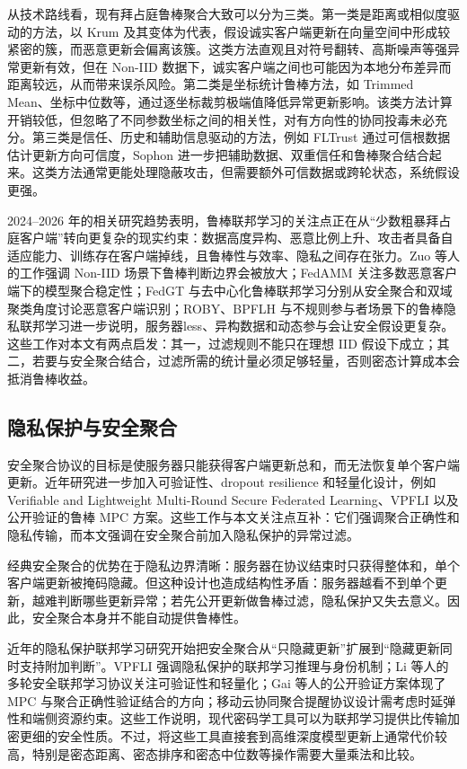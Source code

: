 \documentclass[final]{jcr}
\begin{document}
从技术路线看，现有拜占庭鲁棒聚合大致可以分为三类。第一类是距离或相似度驱动的方法，以 Krum 及其变体为代表，假设诚实客户端更新在向量空间中形成较紧密的簇，而恶意更新会偏离该簇。这类方法直观且对符号翻转、高斯噪声等强异常更新有效，但在 Non-IID 数据下，诚实客户端之间也可能因为本地分布差异而距离较远，从而带来误杀风险。第二类是坐标统计鲁棒方法，如 Trimmed Mean、坐标中位数等，通过逐坐标裁剪极端值降低异常更新影响。该类方法计算开销较低，但忽略了不同参数坐标之间的相关性，对有方向性的协同投毒未必充分。第三类是信任、历史和辅助信息驱动的方法，例如 FLTrust 通过可信根数据估计更新方向可信度\cite{fltrust2021}，Sophon 进一步把辅助数据、双重信任和鲁棒聚合结合起来\cite{sophon2025}。这类方法通常更能处理隐蔽攻击，但需要额外可信数据或跨轮状态，系统假设更强。

2024--2026 年的相关研究趋势表明，鲁棒联邦学习的关注点正在从“少数粗暴拜占庭客户端”转向更复杂的现实约束：数据高度异构、恶意比例上升、攻击者具备自适应能力、训练存在客户端掉线，且鲁棒性与效率、隐私之间存在张力。Zuo 等人的工作强调 Non-IID 场景下鲁棒判断边界会被放大\cite{zuo2025heterogeneity}；FedAMM 关注多数恶意客户端下的模型聚合稳定性\cite{fedamm2025}；FedGT 与去中心化鲁棒联邦学习分别从安全聚合和双域聚类角度讨论恶意客户端识别\cite{fedgt2025,dfl2024dual}；ROBY、BPFLH 与不规则参与者场景下的鲁棒隐私联邦学习进一步说明，服务器less、异构数据和动态参与会让安全假设更复杂\cite{tang2025roby,zhu2026bpflh,chen2024irregular}。这些工作对本文有两点启发：其一，过滤规则不能只在理想 IID 假设下成立；其二，若要与安全聚合结合，过滤所需的统计量必须足够轻量，否则密态计算成本会抵消鲁棒收益。

\subsection{隐私保护与安全聚合}
安全聚合协议的目标是使服务器只能获得客户端更新总和，而无法恢复单个客户端更新\cite{bonawitz2017secagg}。近年研究进一步加入可验证性、dropout resilience 和轻量化设计，例如 Verifiable and Lightweight Multi-Round Secure Federated Learning\cite{li2026verifiable}、VPFLI\cite{ren2025vpfli} 以及公开验证的鲁棒 MPC 方案\cite{gai2025public}。这些工作与本文关注点互补：它们强调聚合正确性和隐私传输，而本文强调在安全聚合前加入隐私保护的异常过滤。

经典安全聚合的优势在于隐私边界清晰：服务器在协议结束时只获得整体和，单个客户端更新被掩码隐藏。但这种设计也造成结构性矛盾：服务器越看不到单个更新，越难判断哪些更新异常；若先公开更新做鲁棒过滤，隐私保护又失去意义。因此，安全聚合本身并不能自动提供鲁棒性。

近年的隐私保护联邦学习研究开始把安全聚合从“只隐藏更新”扩展到“隐藏更新同时支持附加判断”。VPFLI 强调隐私保护的联邦学习推理与身份机制\cite{ren2025vpfli}；Li 等人的多轮安全联邦学习协议关注可验证性和轻量化\cite{li2026verifiable}；Gai 等人的公开验证方案体现了 MPC 与聚合正确性验证结合的方向\cite{gai2025public}；移动云协同聚合提醒协议设计需考虑时延弹性和端侧资源约束\cite{tang2026mobilecloud}。这些工作说明，现代密码学工具可以为联邦学习提供比传输加密更细的安全性质。不过，将这些工具直接套到高维深度模型更新上通常代价较高，特别是密态距离、密态排序和密态中位数等操作需要大量乘法和比较。
\end{document}

